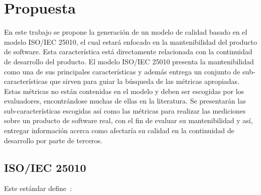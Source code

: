 
\chapter{Propuesta}
En este trabajo se propone la generación de un modelo de calidad basado en el 
modelo ISO/IEC 25010, el cual estará enfocado en la mantenibilidad del producto 
de software. Esta característica está directamente relacionada con la 
continuidad de desarrollo del producto.
El modelo ISO/IEC 25010 presenta la mantenibilidad como una de sus principales
características y además entrega un conjunto de sub-características que sirven para
guiar la búsqueda de las métricas apropiadas.
Estas métricas no están contenidas en el modelo y deben ser escogidas por los evaluadores, 
encontrándose muchas de ellas en la literatura.
Se presentarán las sub-características escogidas así como las 
métricas para realizar las mediciones sobre un producto de software real, 
con el fin de evaluar su mantenibilidad y así, entregar información acerca como afectaría
su calidad en la continuidad de desarrollo por parte de terceros.

\section{ISO/IEC 25010}

Este estándar define~\cite{25010}:

